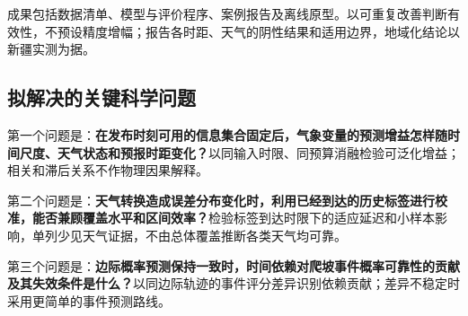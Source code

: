 成果包括数据清单、模型与评价程序、案例报告及离线原型。以可重复改善判断有效性，不预设精度增幅；报告各时距、天气的阴性结果和适用边界，地域化结论以新疆实测为据。

\subsection{拟解决的关键科学问题}
第一个问题是：\textbf{在发布时刻可用的信息集合固定后，气象变量的预测增益怎样随时间尺度、天气状态和预报时距变化？}以同输入时限、同预算消融检验可泛化增益；相关和滞后关系不作物理因果解释。

第二个问题是：\textbf{天气转换造成误差分布变化时，利用已经到达的历史标签进行校准，能否兼顾覆盖水平和区间效率？}检验标签到达时限下的适应延迟和小样本影响，单列少见天气证据，不由总体覆盖推断各类天气均可靠。

第三个问题是：\textbf{边际概率预测保持一致时，时间依赖对爬坡事件概率可靠性的贡献及其失效条件是什么？}以同边际轨迹的事件评分差异识别依赖贡献；差异不稳定时采用更简单的事件预测路线。
